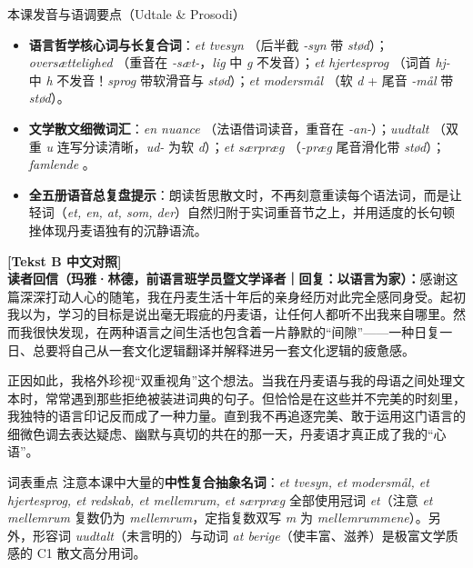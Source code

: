 \begin{tipbox}{本课发音与语调要点（Udtale \& Prosodi）}
\begin{itemize}
  \item \textbf{语言哲学核心词与长复合词}：\textit{et tvesyn} （后半截 \textit{-syn} 带 \textit{stød}）；\textit{oversættelighed} （重音在 \textit{-sæt-}，\textit{lig} 中 \textit{g} 不发音）；\textit{et hjertesprog} （词首 \textit{hj-} 中 \textit{h} 不发音！\textit{sprog} 带软滑音与 \textit{stød}）；\textit{et modersmål} （软 \textit{d} + 尾音 \textit{-mål} 带 \textit{stød}）。
  \item \textbf{文学散文细微词汇}：\textit{en nuance} （法语借词读音，重音在 \textit{-an-}）；\textit{uudtalt} （双重 \textit{u} 连写分读清晰，\textit{ud-} 为软 \textit{d}）；\textit{et særpræg} （\textit{-præg} 尾音滑化带 \textit{stød}）；\textit{famlende} 。
  \item \textbf{全五册语音总复盘提示}：朗读哲思散文时，不再刻意重读每个语法词，而是让轻词（\textit{et, en, at, som, der}）自然归附于实词重音节之上，并用适度的长句顿挫体现丹麦语独有的沉静语流。
\end{itemize}
\end{tipbox}

\begin{transbox}
\small
\textbf{\color{NCDTeal}[Tekst B 中文对照]}\\
\textbf{读者回信（玛雅·林德，前语言班学员暨文学译者｜回复：以语言为家）：}感谢这篇深深打动人心的随笔，我在丹麦生活十年后的亲身经历对此完全感同身受。起初我以为，学习的目标是说出毫无瑕疵的丹麦语，让任何人都听不出我来自哪里。然而我很快发现，在两种语言之间生活也包含着一片静默的“间隙”——一种日复一日、总要将自己从一套文化逻辑翻译并解释进另一套文化逻辑的疲惫感。

正因如此，我格外珍视“双重视角”这个想法。当我在丹麦语与我的母语之间处理文本时，常常遇到那些拒绝被装进词典的句子。但恰恰是在这些并不完美的时刻里，我独特的语言印记反而成了一种力量。直到我不再追逐完美、敢于运用这门语言的细微色调去表达疑虑、幽默与真切的共在的那一天，丹麦语才真正成了我的“心语”。
\end{transbox}


\begin{tipbox}{词表重点}
注意本课中大量的\textbf{中性复合抽象名词}：\textit{et tvesyn, et modersmål, et hjertesprog, et redskab, et mellemrum, et særpræg} 全部使用冠词 \textit{et}（注意 \textit{et mellemrum} 复数仍为 \textit{mellemrum}，定指复数双写 \textit{m} 为 \textit{mellemrummene}）。另外，形容词 \textit{uudtalt}（未言明的）与动词 \textit{at berige}（使丰富、滋养）是极富文学质感的 C1 散文高分用词。
\end{tipbox}

